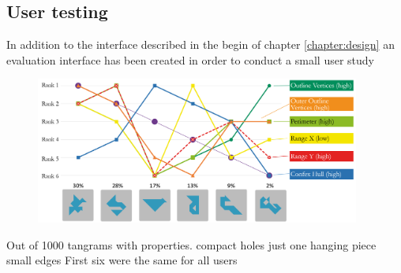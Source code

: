 \subsection{User testing}

In addition to the interface described in the begin of chapter \ref{chapter:design} an evaluation interface has been created in order to conduct a small user study
\begin{figure}
\centering
    \includegraphics[width=0.95\textwidth]{figures/diagram.png}
  \caption{}  
  \label{result}
\end{figure}

Out of 1000 tangrams
with properties. 
compact
holes
just one hanging piece
small edges
First six were the same for all users